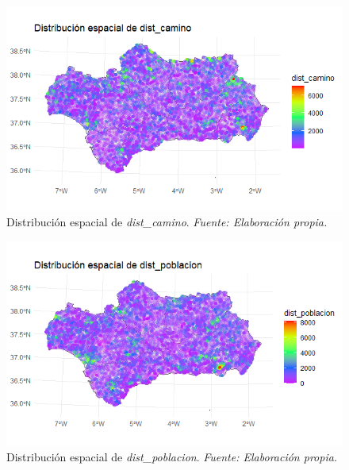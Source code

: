 \documentclass[12pt,a4paper,]{book}
\numberwithin{dummy}{section}
\theoremstyle{ocrenumbox}
\theoremstyle{blacknumex}
\theoremstyle{blacknumbox}
\theoremstyle{ocrenum}
\theoremstyle{ocrenum}
\begin{document}
\begin{figure}[H]
\centering
\includegraphics[width = \textwidth]{graficos/dist_camino_spat.png}
\caption[Distribución espacial de \textit{dist\_camino}]{Distribución espacial de \textit{dist\_camino}. \it Fuente: Elaboración propia.}
\label{fig:dist_camino_spat}
\end{figure}

\begin{figure}[H]
\centering
\includegraphics[width = \textwidth]{graficos/dist_poblacion_spat.png}
\caption[Distribución espacial de \textit{dist\_poblacion}]{Distribución espacial de \textit{dist\_poblacion}. \it Fuente: Elaboración propia.}
\label{fig:dist_poblacion_spat}
\end{figure}
\end{document}
